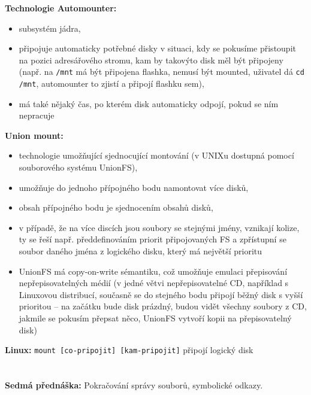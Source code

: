 \documentclass[a4paper, 11pt]{article}
\newcommand{\tcmd}[1]{\texttt{#1}}
\begin{document}
\textbf{Technologie Automounter:}
\begin{itemize}
\item subsystém jádra,
\item připojuje automaticky potřebné disky v situaci, kdy se pokusíme přistoupit na pozici adresářového stromu, kam by takovýto disk měl být připojeny (např. na \texttt{/mnt} má být připojena flashka, nemusí být mounted, uživatel dá \texttt{cd /mnt}, automounter to zjistí a připojí flashku sem),
\item má také nějaký čas, po kterém disk automaticky odpojí, pokud se ním nepracuje
\end{itemize}

\textbf{Union mount:}
\begin{itemize}
\item technologie umožňující sjednocující montování (v UNIXu dostupná pomocí souborového systému UnionFS),
\item umožňuje do jednoho přípojného bodu namontovat více disků,
\item obsah přípojného bodu je sjednocením obsahů disků,
\item v případě, že na více discích jsou soubory se stejnými jmény, vznikají kolize, ty se řeší např. předdefinováním priorit připojovaných FS a zpřístupní se soubor daného jména z logického disku, který má největší prioritu
\item UnionFS má copy-on-write sémantiku, což umožňuje emulaci přepisování nepřepisovatelných médií (v jedné větvi nepřepisovatelné CD, například s Linuxovou distribucí, současně se do stejného bodu připojí běžný disk s vyšší prioritou -- na začátku bude disk prázdný, budou vidět všechny soubory z CD, jakmile se pokusím přepsat něco, UnionFS vytvoří kopii na přepisovatelný disk)
\end{itemize}

\textbf{Linux:}
\tcmd{mount [co-pripojit] [kam-pripojit]} připojí logický disk

\newpage
\section{}
\textbf{Sedmá přednáška:} Pokračování správy souborů, symbolické odkazy.
\end{document}
